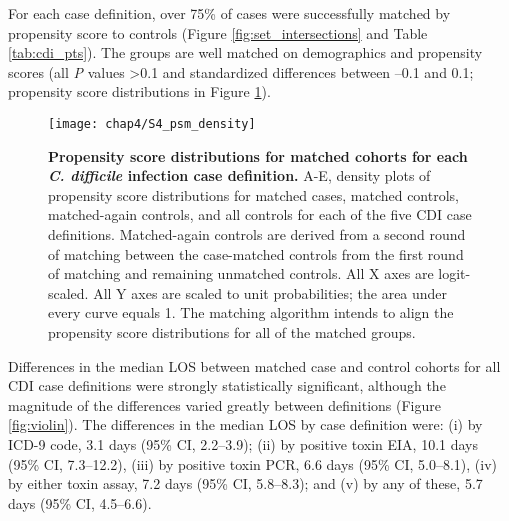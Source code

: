 \begin{table*}[ht]
  \caption[Demographic characteristics of the study population and matched cohorts]{\textbf{Demographic characteristics of the study population and matched cohorts.} Abbreviation: CDI, Clostridium difficile infection; ICD-9, International Classification of Diseases Ninth Revision; EIA, enzyme immunoassay; PCR, polymerase chain reaction; SMD, standardized mean difference. $^a$Separate columns are unnecessary because 1:1 exact matching was performed on the characteristics shown, and therefore all values are identical. $^b$SMD is shown for age treated as a continuous variable; coarsened exact matching was performed using the listed age ranges.
}
  \label{tab:cdi_pts}
\end{table*}

For each case definition, over 75\% of cases were successfully matched by propensity score to controls (Figure \ref{fig:set_intersections} and Table \ref{tab:cdi_pts}). The groups are well matched on demographics and propensity scores (all \emph{P} values >0.1 and standardized differences between –0.1 and 0.1; propensity score distributions in Figure \ref{fig:psm_density}).
\begin{figure}[htb]
  \texttt{[image: chap4/S4\_psm\_density]}
  \caption[Propensity score distributions for matched cohorts for each \emph{C. difficile} infection case definition]{
    \textbf{Propensity score distributions for matched cohorts for each \emph{C. difficile} infection case definition.} A-E, density plots of propensity score distributions for matched cases, matched controls, matched-again controls, and all controls for each of the five CDI case definitions. Matched-again controls are derived from a second round of matching between the case-matched controls from the first round of matching and remaining unmatched controls. All X axes are logit-scaled. All Y axes are scaled to unit probabilities; the area under every curve equals 1. The matching algorithm intends to align the propensity score distributions for all of the matched groups.
  }
  \label{fig:psm_density}
\end{figure}
Differences in the median LOS between matched case and control cohorts for all CDI case definitions were strongly statistically significant, although the magnitude of the differences varied greatly between definitions (Figure \ref{fig:violin}). The differences in the median LOS by case definition were: (i) by ICD-9 code, 3.1 days (95\% CI, 2.2–3.9); (ii) by positive toxin EIA, 10.1 days (95\% CI, 7.3–12.2), (iii) by positive toxin PCR, 6.6 days (95\% CI, 5.0–8.1), (iv) by either toxin assay, 7.2 days (95\% CI, 5.8–8.3); and (v) by any of these, 5.7 days (95\% CI, 4.5–6.6). 
